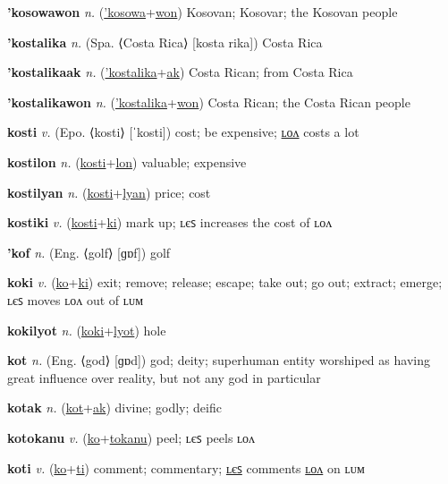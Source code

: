 \textbf{\hypertarget{'kosowawon}{'kosowawon}} \textit{n.} (\hyperlink{'kosowa}{'kosowa}+\allowbreak \hyperlink{won}{won})
Kosovan; Kosovar; the Kosovan people

\textbf{\hypertarget{'kostalika}{'kostalika}} \textit{n.} (Spa. ⟨Costa Rica⟩ [kosta rika])
Costa Rica

\textbf{\hypertarget{'kostalikaak}{'kostalikaak}} \textit{n.} (\hyperlink{'kostalika}{'kostalika}+\allowbreak \hyperlink{ak}{ak})
Costa Rican; from Costa Rica

\textbf{\hypertarget{'kostalikawon}{'kostalikawon}} \textit{n.} (\hyperlink{'kostalika}{'kostalika}+\allowbreak \hyperlink{won}{won})
Costa Rican; the Costa Rican people

\textbf{\hypertarget{kosti}{kosti}} \textit{v.} (Epo. ⟨kosti⟩ [ˈkosti])
cost; be expensive; \hyperlink{kostilon}{ʟᴏᴧ} costs a lot

\textbf{\hypertarget{kostilon}{kostilon}} \textit{n.} (\hyperlink{kosti}{kosti}+\allowbreak \hyperlink{lon}{lon})
valuable; expensive

\textbf{\hypertarget{kostilyan}{kostilyan}} \textit{n.} (\hyperlink{kosti}{kosti}+\allowbreak \hyperlink{lyan}{lyan})
price; cost

\textbf{\hypertarget{kostiki}{kostiki}} \textit{v.} (\hyperlink{kosti}{kosti}+\allowbreak \hyperlink{ki}{ki})
mark up; ʟєꜱ increases the cost of ʟᴏᴧ

\textbf{\hypertarget{'kof}{'kof}} \textit{n.} (Eng. ⟨golf⟩ [ɡɒf])
golf

\textbf{\hypertarget{koki}{koki}} \textit{v.} (\hyperlink{ko}{ko}+\allowbreak \hyperlink{ki}{ki})
exit; remove; release; escape; take out; go out; extract; emerge; ʟєꜱ moves ʟᴏᴧ out of ʟᴜᴍ

\textbf{\hypertarget{kokilyot}{kokilyot}} \textit{n.} (\hyperlink{koki}{koki}+\allowbreak \hyperlink{lyot}{lyot})
hole

\textbf{\hypertarget{kot}{kot}} \textit{n.} (Eng. ⟨god⟩ [ɡɒd])
god; deity; superhuman entity worshiped as having great influence over reality, but not any god in particular

\textbf{\hypertarget{kotak}{kotak}} \textit{n.} (\hyperlink{kot}{kot}+\allowbreak \hyperlink{ak}{ak})
divine; godly; deific

\textbf{\hypertarget{kotokanu}{kotokanu}} \textit{v.} (\hyperlink{ko}{ko}+\allowbreak \hyperlink{tokanu}{tokanu})
peel; ʟєꜱ peels ʟᴏᴧ

\textbf{\hypertarget{koti}{koti}} \textit{v.} (\hyperlink{ko}{ko}+\allowbreak \hyperlink{ti}{ti})
comment; commentary; \hyperlink{kotiles}{ʟєꜱ} comments \hyperlink{kotilon}{ʟᴏᴧ} on ʟᴜᴍ


